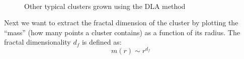 \documentclass[aps,prl,preprint,superscriptaddress]{revtex4}
\begin{document}
\begin{figure}[H]
	\centering
	\\
	\caption{Other typical clusters grown using the DLA method}
	\label{more_clusters} 
\end{figure}


Next we want to extract the fractal dimension of the cluster by plotting the ``mass'' (how many points a cluster contains) as a function of its radius. The fractal dimensionality $d_f$ is defined as:
\begin{equation}
m(r) \sim r^{d_f}
\end{equation}
\end{document}
